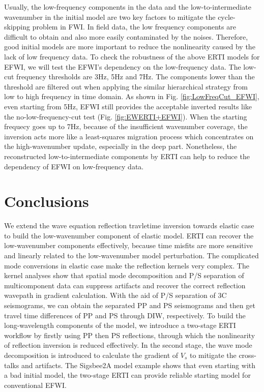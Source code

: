 \documentclass[extra,mreferee]{gji}
\begin{document}
Usually, the low-frequency components in the data and the low-to-intermediate wavenumber in the
initial model are two key factors to mitigate the cycle-skipping problem in FWI. In field data, the
low frequency components are difficult to obtain and also more easily contaminated by the noises.
Therefore, good initial models are more important to reduce the nonlinearity caused by the lack of low frequency data.
To check the robustness of the above ERTI models for EFWI, we will test the EFWI's dependency on 
the low-frequency data.%
The low-cut frequency thresholds are 3Hz,
5Hz and 7Hz. The components lower than the threshold are filtered out when applying the similar
hierarchical strategy from low to high frequency in time domain.
As shown in Fig. \ref{fig:LowFreqCut_EFWI}, even starting from 5Hz, EFWI still
provides the acceptable inverted results like
the no-low-frequency-cut test (Fig. \ref{fig:EWERTI+EFWI}). 
When the starting frequecy goes up to 7Hz, 
because of the insufficient wavenumber coverage, the inversion acts more like a least-squares migration process which concentrates on
the high-wavenumber update, especially in the deep part.
Nonetheless, the reconstructed low-to-intermediate components by ERTI can help to reduce the
dependency of EFWI on low-frequency data. 
\section{Conclusions}
We extend the wave equation reflection travletime inversion towards elastic case to build the
low-wavenumber
component of elastic model. 
ERTI can recover the low-wavenumber components effectively, because time misfits are more sensitive
and linearly related to the low-wavenumber model perturbation. 
The complicated mode conversions in elastic case make the reflection kernels very complex.
The kernel analyses show that spatial mode decomposition and P/S separation of
multicomponent data can suppress artifacts and recover the correct reflection wavepath in gradient calculation.
With the aid of 
P/S separation of 3C seismograms, we can obtain the separated PP and PS seismograms and then get
travel time differences of PP and PS through DIW, respectively. 
To build the long-wavelength components of the model, we introduce a two-stage ERTI
workflow by firstly using PP then PS reflections, through which the nonlinearity of reflection
inversion is reduced effectively. 
In the second stage, the wave mode
decomposition is introduced to calculate the gradient of $V_s$ to mitigate the
cross-talks and artifacts.
The Sigsbee2A model example shows that even starting with a bad initial model, the
two-stage ERTI can provide reliable starting model for conventional EFWI. 
\end{document}
